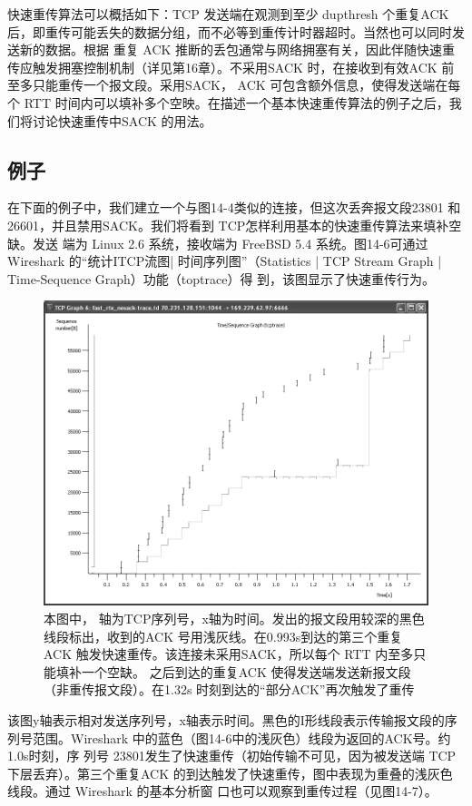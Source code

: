 快速重传算法可以概括如下：TCP 发送端在观测到至少 dupthresh 个重复ACK
后，即重传可能丢失的数据分组，而不必等到重传计时器超时。当然也可以同时发送新的数据。根据
重复 ACK 推断的丢包通常与网络拥塞有关，因此伴随快速重传应触发拥塞控制机制（详见第16章）。不采用SACK 时，在接收到有效ACK
前至多只能重传一个报文段。采用SACK，
ACK 可包含额外信息，使得发送端在每个 RTT 时间内可以填补多个空映。在描述一个基本快速重传算法的例子之后，我们将讨论快速重传中SACK 的用法。

\subsection{例子}
在下面的例子中，我们建立一个与图14-4类似的连接，但这次丢奔报文段23801 和26601，并且禁用SACK。我们将看到
TCP怎样利用基本的快速重传算法来填补空缺。发送
端为 Linux 2.6 系统，接收端为 FreeBSD 5.4 系统。图14-6可通过 Wireshark 的“统计ITCP流图|
时间序列图”（Statistics | TCP Stream Graph | Time-Sequence Graph）功能（toptrace）得
到，该图显示了快速重传行为。

\begin{figure}[!htb]
\includegraphics[width=1.0\textwidth]{imgs/14/14-6.png}
\caption{本图中， 轴为TCP序列号，x轴为时间。发出的报文段用较深的黑色线段标出，收到的ACK
号用浅灰线。在0.993s到达的第三个重复 ACK 触发快速重传。该连接未采用SACK，所以每个 RTT 内至多只能填补一个空缺。
之后到达的重复ACK 使得发送端发送新报文段（非重传报文段）。在1.32s 时刻到达的“部分ACK”再次触发了重传}
\end{figure}

该图y轴表示相对发送序列号，x轴表示时间。黑色的I形线段表示传输报文段的序列号范围。Wireshark
中的蓝色（图14-6中的浅灰色）线段为返回的ACK号。约1.0s时刻，序
列号 23801发生了快速重传（初始传输不可见，因为被发送端 TCP 下层丢弃）。第三个重复ACK
的到达触发了快速重传，图中表现为重叠的浅灰色线段。通过 Wireshark 的基本分析窗
口也可以观察到重传过程（见图14-7）。

